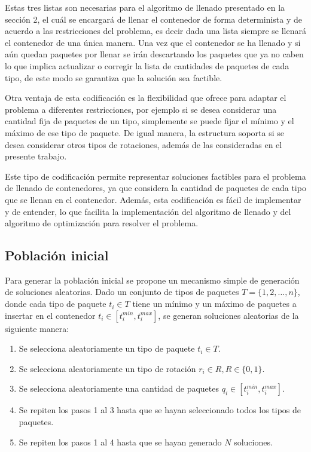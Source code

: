 Estas tres listas son necesarias para el algoritmo de llenado presentado en la sección 2, el cuál se encargará de llenar el contenedor de forma determinista y de acuerdo a las restricciones del problema, es decir dada una lista siempre se llenará el contenedor de una única manera. Una vez que el contenedor se ha llenado y si aún quedan paquetes por llenar se irán descartando los paquetes que ya no caben lo que implica actualizar o corregir la lista de cantidades de paquetes de cada tipo, de este modo se garantiza que la solución sea factible.

Otra ventaja de esta codificación es la flexibilidad que ofrece para adaptar el problema a diferentes restricciones, por ejemplo si se desea considerar una cantidad fija de paquetes de un tipo, simplemente se puede fijar el mínimo y el máximo de ese tipo de paquete. De igual manera, la estructura soporta si se desea considerar otros tipos de rotaciones, además de las consideradas en el presente trabajo. 

Este tipo de codificación permite representar soluciones factibles para el problema de llenado de contenedores, ya que considera la cantidad de paquetes de cada tipo que se llenan en el contenedor. Además, esta codificación es fácil de implementar y de entender, lo que facilita la implementación del algoritmo de llenado y del algoritmo de optimización para resolver el problema.


    
\subsection{Población inicial}

Para generar la población inicial se propone un mecanismo simple de generación de soluciones aleatorias. Dado un conjunto de tipos de paquetes $T = \{1,2, \ldots, n\}$, donde cada tipo de paquete $t_i \in T$ tiene un mínimo y un máximo de paquetes a insertar en el contenedor $t_i \in [t_i^{min},t_i^{max}]$, se generan soluciones aleatorias de la siguiente manera:

\begin{enumerate}
\item Se selecciona aleatoriamente un tipo de paquete $t_i \in T$.
\item Se selecciona aleatoriamente un tipo de rotación $r_i \in R, R \in \{0,1\}$.
\item Se selecciona aleatoriamente una cantidad de paquetes $q_i \in [t_i^{min},t_i^{max}]$.
\item Se repiten los pasos 1 al 3 hasta que se hayan seleccionado todos los tipos de paquetes.
\item Se repiten los pasos 1 al 4 hasta que se hayan generado $N$ soluciones.
\end{enumerate}

